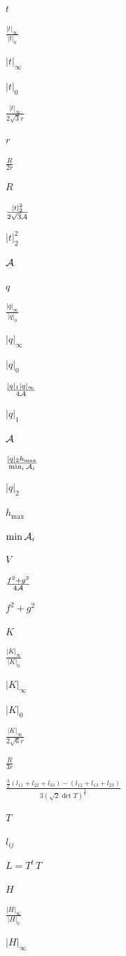 \documentclass{article}
\begin{document}
$t$
\pagebreak

$\frac{|t|_\infty}{|t|_0}$
\pagebreak

$|t|_\infty$
\pagebreak

$|t|_0$
\pagebreak

$\frac{|t|_\infty}{2\sqrt{3}r}$
\pagebreak

$r$
\pagebreak

$\frac{R}{2r}$
\pagebreak

$R$
\pagebreak

$\frac{|t|^2_2}{2\sqrt{3}{\cal A}}$
\pagebreak

$|t|^2_2$
\pagebreak

$\cal A$
\pagebreak

$q$
\pagebreak

$\frac{|q|_\infty}{|q|_0}$
\pagebreak

$|q|_\infty$
\pagebreak

$|q|_0$
\pagebreak

$\frac{|q|_1|q|_\infty}{4{\cal A}}$
\pagebreak

$|q|_1$
\pagebreak

${\cal A}$
\pagebreak

$\frac{|q|_2h_{\max}}{\min_i{\cal A}_i}$
\pagebreak

$|q|_2$
\pagebreak

$h_{\max}$
\pagebreak

$\min{\cal A}_i$
\pagebreak

$V$
\pagebreak

$\frac{f^2+g^2}{4{\cal A}}$
\pagebreak

$f^2+g^2$
\pagebreak

$K$
\pagebreak

$\frac{|K|_\infty}{|K|_0}$
\pagebreak

$|K|_\infty$
\pagebreak

$|K|_0$
\pagebreak

$\frac{|K|_\infty}{2\sqrt{6}r}$
\pagebreak

$\frac{R}{3r}$
\pagebreak

$\frac{\frac{3}{2}(l_{11}+l_{22}+l_{33}) - (l_{12}+l_{13}+l_{23})}
{3(\sqrt{2}\det{T})^\frac{2}{3}}$
\pagebreak

$T$
\pagebreak

$l_{ij}$
\pagebreak

$L=T^t\,T$
\pagebreak

$H$
\pagebreak

$\frac{|H|_\infty}{|H|_0}$
\pagebreak

$|H|_\infty$
\pagebreak
\end{document}
